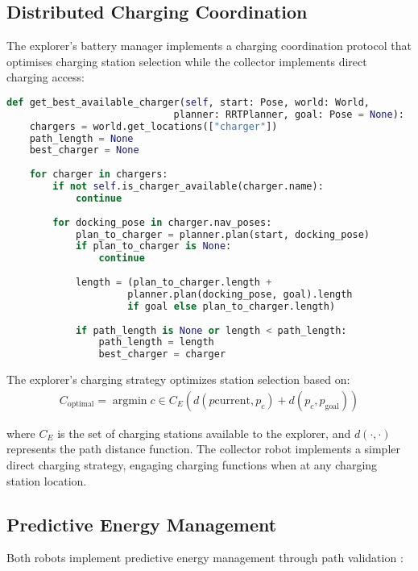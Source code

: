 \documentclass{csfourzero}
\begin{document}
\subsection{Distributed Charging Coordination}

The explorer's battery manager implements a charging coordination protocol \cite{marder2010ros} that optimises charging station selection while the collector implements direct charging access:

\begin{lstlisting}[language=Python]
def get_best_available_charger(self, start: Pose, world: World, 
                             planner: RRTPlanner, goal: Pose = None):
    chargers = world.get_locations(["charger"])
    path_length = None
    best_charger = None
    
    for charger in chargers:
        if not self.is_charger_available(charger.name):
            continue
            
        for docking_pose in charger.nav_poses:
            plan_to_charger = planner.plan(start, docking_pose)
            if plan_to_charger is None:
                continue
                
            length = (plan_to_charger.length + 
                     planner.plan(docking_pose, goal).length 
                     if goal else plan_to_charger.length)
                     
            if path_length is None or length < path_length:
                path_length = length
                best_charger = charger
\end{lstlisting}

The explorer's charging strategy optimizes station selection based on:
\begin{align*}
C_{\text{optimal}} = \operatorname{argmin}{c \in C_E} (d(p{\text{current}}, p_c) + d(p_c, p_{\text{goal}}))
\end{align*}

where $C_E$ is the set of charging stations available to the explorer, and $d(\cdot,\cdot)$ represents the path distance function. The collector robot implements a simpler direct charging strategy, engaging charging functions when at any charging station location.

\subsection{Predictive Energy Management}

Both robots implement predictive energy management through path validation \cite{LaValle1998}:
\end{document}
